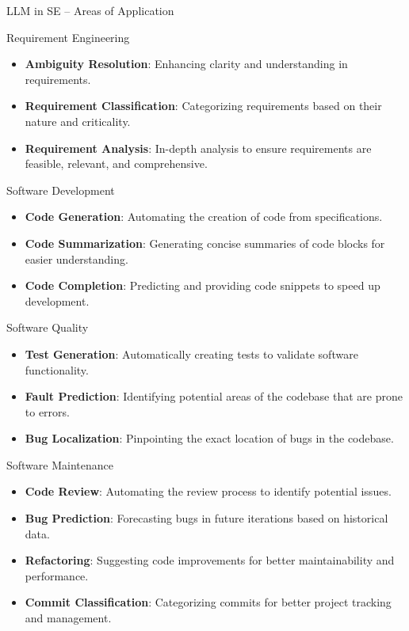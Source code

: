 \documentclass[presentation, 10pt]{beamer}\mode<presentation>{\usetheme{AMSBolognaFC}}
\begin{document}
\begin{frame}[allowframebreaks]{LLM in SE -- Areas of Application}
	\begin{exampleblock}{Requirement Engineering}
			\begin{itemize}
					\item \textbf{Ambiguity Resolution}: Enhancing clarity and understanding in requirements.
					\item \textbf{Requirement Classification}: Categorizing requirements based on their nature and criticality.
					\item \textbf{Requirement Analysis}: In-depth analysis to ensure requirements are feasible, relevant, and comprehensive.
			\end{itemize}
	\end{exampleblock}
	
	\begin{exampleblock}{Software Development}
			\begin{itemize}
					\item \textbf{Code Generation}: Automating the creation of code from specifications.
					\item \textbf{Code Summarization}: Generating concise summaries of code blocks for easier understanding.
					\item \textbf{Code Completion}: Predicting and providing code snippets to speed up development.
			\end{itemize}
	\end{exampleblock}

	\framebreak

	\begin{exampleblock}{Software Quality}
			\begin{itemize}
					\item \textbf{Test Generation}: Automatically creating tests to validate software functionality.
					\item \textbf{Fault Prediction}: Identifying potential areas of the codebase that are prone to errors.
					\item \textbf{Bug Localization}: Pinpointing the exact location of bugs in the codebase.
			\end{itemize}
	\end{exampleblock}

	\begin{exampleblock}{Software Maintenance}
			\begin{itemize}
					\item \textbf{Code Review}: Automating the review process to identify potential issues.
					\item \textbf{Bug Prediction}: Forecasting bugs in future iterations based on historical data.
					\item \textbf{Refactoring}: Suggesting code improvements for better maintainability and performance.
					\item \textbf{Commit Classification}: Categorizing commits for better project tracking and management.
			\end{itemize}
	\end{exampleblock}
\end{frame}
\end{document}
